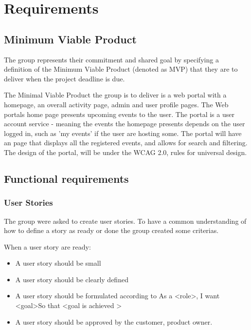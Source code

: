 
\chapter{Requirements}

\section{Minimum Viable Product}
\label{MVP}
The group represents their commitment and shared goal by specifying a definition of the Minimum Viable Product (denoted as MVP) that they are to deliver when the project deadline is due.

The Minimal Viable Product the group is to deliver is a web portal with a homepage, an overall activity page, admin and user profile pages. The Web portals home page presents upcoming events to the user. The portal is a user account service - meaning the events the homepage presents depends on the user logged in, such as 'my events'  if the user are hosting some. The portal will have an page that displays all the registered events, and allows for search and filtering. 
The design of the portal, will be under the WCAG 2.0, rules for universal design.

\section{Functional requirements}
\subsection{User Stories}
\label{User stories}
The group were asked to create user stories. To have a common understanding of how to define a story as ready or done the group created some criterias. 

\begin{description}
    \item[When a user story are ready:]
\end{description}
\begin{itemize}[noitemsep]
    \item A user story should be small
    \item A user story should be clearly defined
    \item A user story should be formulated according to As a \textless role\textgreater, I want \textless goal\textgreater So that \textless goal is achieved \textgreater
    \item A user story should be approved by the customer, product owner.
\end{itemize}

